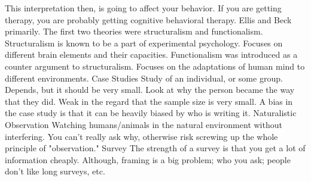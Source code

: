 \markdownRendererUlItem This interpretation then, is going to affect your behavior. If you are getting therapy, you are probably getting cognitive behavioral therapy.\markdownRendererUlItemEnd 
\markdownRendererUlItem Ellis and Beck primarily.\markdownRendererUlItemEnd 
\markdownRendererUlEndTight \markdownRendererInterblockSeparator
{}\markdownRendererInterblockSeparator
{}\markdownRendererUlBeginTight
\markdownRendererUlItem The first two theories were structuralism and functionalism.\markdownRendererUlItemEnd 
\markdownRendererUlItem Structuralism is known to be a part of experimental psychology.\markdownRendererInterblockSeparator
{}\markdownRendererUlBeginTight
\markdownRendererUlItem Focuses on different brain elements and their capacities.\markdownRendererUlItemEnd 
\markdownRendererUlEndTight \markdownRendererUlItemEnd 
\markdownRendererUlItem Functionalism was introduced as a counter argument to structuralism.\markdownRendererInterblockSeparator
{}\markdownRendererUlBeginTight
\markdownRendererUlItem Focuses on the adaptations of human mind to different environments.\markdownRendererUlItemEnd 
\markdownRendererUlEndTight \markdownRendererUlItemEnd 
\markdownRendererUlEndTight \markdownRendererInterblockSeparator
{}\markdownRendererInterblockSeparator
{}\markdownRendererUlBeginTight
\markdownRendererUlItem Case Studies\markdownRendererInterblockSeparator
{}\markdownRendererUlBeginTight
\markdownRendererUlItem Study of an individual, or some group. Depends, but it should be very small.\markdownRendererUlItemEnd 
\markdownRendererUlItem Look at why the person became the way that they did.\markdownRendererUlItemEnd 
\markdownRendererUlItem Weak in the regard that the sample size is very small.\markdownRendererUlItemEnd 
\markdownRendererUlItem A bias in the case study is that it can be heavily biased by who is writing it.\markdownRendererUlItemEnd 
\markdownRendererUlEndTight \markdownRendererUlItemEnd 
\markdownRendererUlItem Naturalistic Observation\markdownRendererInterblockSeparator
{}\markdownRendererUlBeginTight
\markdownRendererUlItem Watching humans/animals in the natural environment without interfering.\markdownRendererUlItemEnd 
\markdownRendererUlItem You can't really ask why, otherwise risk screwing up the whole principle of "observation."\markdownRendererUlItemEnd 
\markdownRendererUlEndTight \markdownRendererUlItemEnd 
\markdownRendererUlItem Survey\markdownRendererInterblockSeparator
{}\markdownRendererUlBeginTight
\markdownRendererUlItem The strength of a survey is that you get a lot of information cheaply. Although, framing is a big problem; who you ask; people don't like long surveys, etc.\markdownRendererUlItemEnd 
